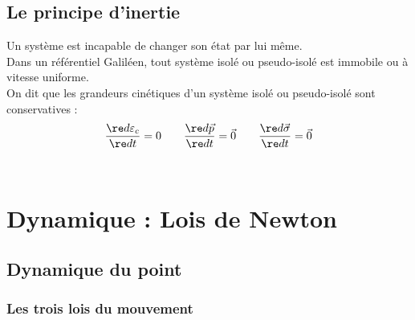 \documentclass[13pt, twoside, a4paper, french]{report}
\begin{document}


        \section{Le principe d'inertie}\label{sec:le-principe-d'inertie}

            Un système est incapable de changer son état par lui même.\\
            Dans un référentiel Galiléen, tout système isolé ou pseudo-isolé est immobile ou à vitesse uniforme.\\

            On dit que les grandeurs cinétiques d'un système isolé ou pseudo-isolé sont conservatives :\\
            \[\dfrac{\re d \varepsilon_c}{\re d t} = 0 \quad\quad \dfrac{\re d \vec p}{\re d t} = \vec 0 \quad\quad \dfrac{\re d \vec \sigma}{\re d t} = \vec 0\]\\


    \chapter{Dynamique : Lois de Newton}\label{ch:dynamique-lois-de-newton}


        \section{Dynamique du point}\label{sec:dynamique-du-point}

            \subsection{Les trois lois du mouvement}\label{subsec:les-trois-lois-du-mouvement}
\end{document}
